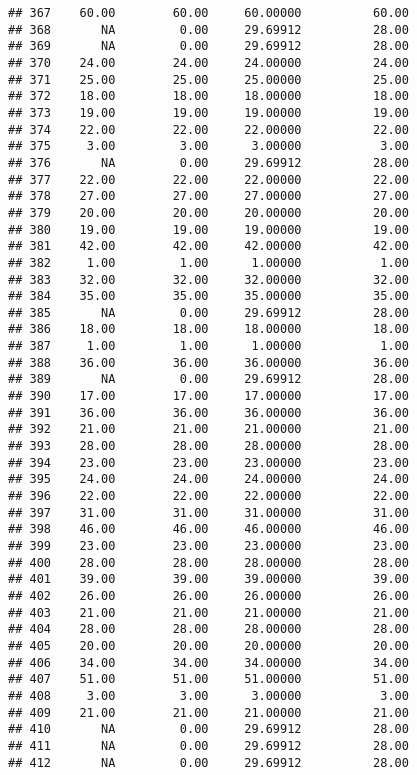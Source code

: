 \documentclass[
]{article}
\begin{document}
\begin{verbatim}
## 367    60.00        60.00     60.00000          60.00
## 368       NA         0.00     29.69912          28.00
## 369       NA         0.00     29.69912          28.00
## 370    24.00        24.00     24.00000          24.00
## 371    25.00        25.00     25.00000          25.00
## 372    18.00        18.00     18.00000          18.00
## 373    19.00        19.00     19.00000          19.00
## 374    22.00        22.00     22.00000          22.00
## 375     3.00         3.00      3.00000           3.00
## 376       NA         0.00     29.69912          28.00
## 377    22.00        22.00     22.00000          22.00
## 378    27.00        27.00     27.00000          27.00
## 379    20.00        20.00     20.00000          20.00
## 380    19.00        19.00     19.00000          19.00
## 381    42.00        42.00     42.00000          42.00
## 382     1.00         1.00      1.00000           1.00
## 383    32.00        32.00     32.00000          32.00
## 384    35.00        35.00     35.00000          35.00
## 385       NA         0.00     29.69912          28.00
## 386    18.00        18.00     18.00000          18.00
## 387     1.00         1.00      1.00000           1.00
## 388    36.00        36.00     36.00000          36.00
## 389       NA         0.00     29.69912          28.00
## 390    17.00        17.00     17.00000          17.00
## 391    36.00        36.00     36.00000          36.00
## 392    21.00        21.00     21.00000          21.00
## 393    28.00        28.00     28.00000          28.00
## 394    23.00        23.00     23.00000          23.00
## 395    24.00        24.00     24.00000          24.00
## 396    22.00        22.00     22.00000          22.00
## 397    31.00        31.00     31.00000          31.00
## 398    46.00        46.00     46.00000          46.00
## 399    23.00        23.00     23.00000          23.00
## 400    28.00        28.00     28.00000          28.00
## 401    39.00        39.00     39.00000          39.00
## 402    26.00        26.00     26.00000          26.00
## 403    21.00        21.00     21.00000          21.00
## 404    28.00        28.00     28.00000          28.00
## 405    20.00        20.00     20.00000          20.00
## 406    34.00        34.00     34.00000          34.00
## 407    51.00        51.00     51.00000          51.00
## 408     3.00         3.00      3.00000           3.00
## 409    21.00        21.00     21.00000          21.00
## 410       NA         0.00     29.69912          28.00
## 411       NA         0.00     29.69912          28.00
## 412       NA         0.00     29.69912          28.00

\end{verbatim}
\end{document}
